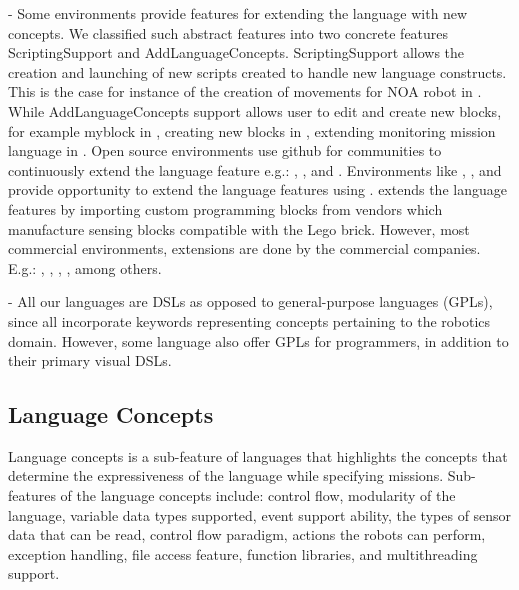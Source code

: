 \parhead{\fextensibility} -
Some environments provide features for extending the language with new concepts. We classified such abstract features into two concrete features ScriptingSupport and AddLanguageConcepts. %
ScriptingSupport allows the creation and launching of new scripts created to handle new language constructs. This is the case for instance of the creation of  movements for NOA robot in \choregraphe.
 While AddLanguageConcepts support allows user to edit and create new blocks, for example myblock in \makeblock, creating new blocks in \tivipe, extending monitoring mission language in \flyaq.   Open source environments use github for communities to continuously extend the language feature e.g.: \sphero, \openroberta, and \flyaq. Environments like \easyc, \flyaq, and \missionlab provide opportunity to extend the language features using . 
\lego extends the language features by importing custom programming blocks from vendors which manufacture sensing blocks compatible with the Lego brick. However, most commercial environments, extensions  are done by the commercial companies. E.g.: \arcbotics, \edison, \blocklyprop, \vex, \robotmesh among others.

\parhead{\flangparadigm} - All our languages are DSLs as opposed to general-purpose languages (GPLs), since all incorporate keywords representing concepts pertaining to the robotics domain. However, some language also offer GPLs for programmers, in addition to their primary visual DSLs.



\subsection{Language Concepts}\label{sec:langconcepts}
Language concepts is a sub-feature of languages that %
highlights the concepts that determine the expressiveness of the language while specifying missions. Sub-features of the language concepts include: control flow, modularity of the language, variable data types supported, event support ability, the types of sensor data that can be read, control flow paradigm, actions the robots can perform, exception handling, file access feature, function libraries, and multithreading support.

